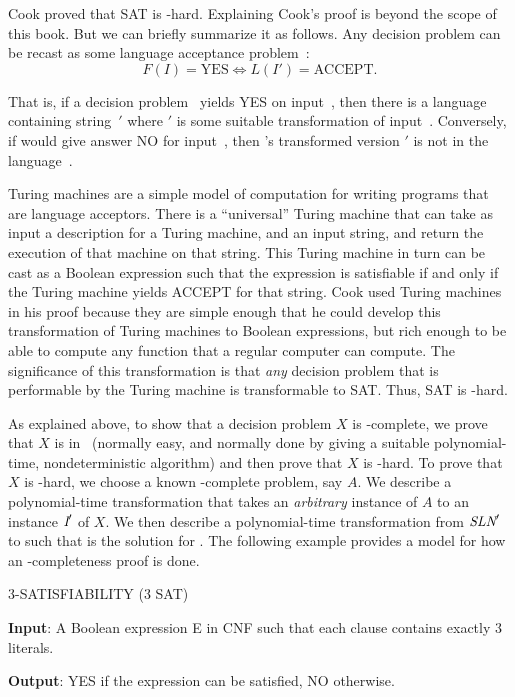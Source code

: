 Cook proved that SAT is \NP-hard.
Explaining Cook's proof is beyond the scope of this book.
But we can briefly summarize it as follows.
Any decision problem  can be recast as some language
acceptance problem~:
\[F(I) = \mbox{YES} \Leftrightarrow L(I') = \mbox{ACCEPT}.\]

\noindent That is, if a decision problem~ yields YES on
input~, then there is a language~ containing 
string~\('\) where \('\) is some suitable
transformation of input~.
Conversely, if  would give answer NO for input~, then
's transformed version \('\) is not in the
language~.

Turing machines are a simple model of computation for writing
programs that are language acceptors.
There is a ``universal'' Turing machine that can take as input a
description for a Turing machine, and an input string, and return the
execution of that machine on that string.
This Turing machine in turn can be cast as a Boolean expression such
that the expression is satisfiable if and only if the Turing machine
yields ACCEPT for that string.
Cook used Turing machines in his proof because they are simple enough
that he could develop this transformation of Turing machines to
Boolean expressions, but rich enough to be able to compute any
function that a regular computer can compute.
The significance of this transformation is that \emph{any} decision
problem that is performable by the Turing machine is transformable to
SAT.
Thus, SAT is \NP-hard.

As explained above, to show that a decision problem \(X\)
is
\NP-complete, we prove that \(X\) is in \NP\ (normally easy, and
normally done by giving a suitable polynomial-time, nondeterministic
algorithm) and then prove that \(X\) is \NP-hard.
To prove that \(X\) is \NP-hard, we choose a known \NP-complete
problem, say \(A\). 
We describe a polynomial-time transformation that takes an
\emph{arbitrary} instance  of \(A\) to an instance
\({\textit{I}}'\) of \(X\).
We then describe a polynomial-time transformation from
\({\textit{SLN}}'\) to  such that  is the solution
for .
The following example provides a model for how an
\NP-com\-p\-lete\-ness proof is done.

\begin{inbox}
3-SATISFIABILITY (3 SAT)

{\bf Input}: A Boolean expression E in CNF such that each clause
contains exactly 3 literals.

{\bf Output}: YES if the expression can be satisfied, NO otherwise.
\end{inbox}

